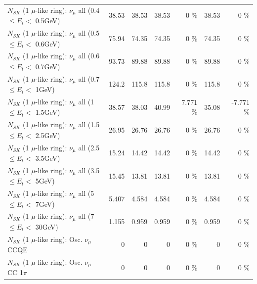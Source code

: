 \begin{table}
\begin{tabular}{| l | r | r | r  r | r  r |}
       $N_{SK}$ (1 $\mu$-like ring): $\nu_{\mu}$ all (0.4 $\leq E_{t} <$ 0.5GeV) &           38.53 &           38.53 &           38.53 &        0 \%  &           38.53 &        0 \%  \\ 
       $N_{SK}$ (1 $\mu$-like ring): $\nu_{\mu}$ all (0.5 $\leq E_{t} <$ 0.6GeV) &           75.94 &           74.35 &           74.35 &        0 \%  &           74.35 &        0 \%  \\ 
       $N_{SK}$ (1 $\mu$-like ring): $\nu_{\mu}$ all (0.6 $\leq E_{t} <$ 0.7GeV) &           93.73 &           89.88 &           89.88 &        0 \%  &           89.88 &        0 \%  \\ 
         $N_{SK}$ (1 $\mu$-like ring): $\nu_{\mu}$ all (0.7 $\leq E_{t} <$ 1GeV) &           124.2 &           115.8 &           115.8 &        0 \%  &           115.8 &        0 \%  \\ 
         $N_{SK}$ (1 $\mu$-like ring): $\nu_{\mu}$ all (1 $\leq E_{t} <$ 1.5GeV) &           38.57 &           38.03 &           40.99 &    7.771 \%  &           35.08 &   -7.771 \%  \\ 
       $N_{SK}$ (1 $\mu$-like ring): $\nu_{\mu}$ all (1.5 $\leq E_{t} <$ 2.5GeV) &           26.95 &           26.76 &           26.76 &        0 \%  &           26.76 &        0 \%  \\ 
       $N_{SK}$ (1 $\mu$-like ring): $\nu_{\mu}$ all (2.5 $\leq E_{t} <$ 3.5GeV) &           15.24 &           14.42 &           14.42 &        0 \%  &           14.42 &        0 \%  \\ 
         $N_{SK}$ (1 $\mu$-like ring): $\nu_{\mu}$ all (3.5 $\leq E_{t} <$ 5GeV) &           15.45 &           13.81 &           13.81 &        0 \%  &           13.81 &        0 \%  \\ 
           $N_{SK}$ (1 $\mu$-like ring): $\nu_{\mu}$ all (5 $\leq E_{t} <$ 7GeV) &           5.407 &           4.584 &           4.584 &        0 \%  &           4.584 &        0 \%  \\ 
          $N_{SK}$ (1 $\mu$-like ring): $\nu_{\mu}$ all (7 $\leq E_{t} <$ 30GeV) &           1.155 &           0.959 &           0.959 &        0 \%  &           0.959 &        0 \%  \\ 
\hline
\hline
                               $N_{SK}$ (1 $\mu$-like ring): Osc. $\nu_\mu$ CCQE &               0 &               0 &               0 &        0 \%  &               0 &        0 \%  \\ 
                          $N_{SK}$ (1 $\mu$-like ring): Osc. $\nu_\mu$ CC 1$\pi$ &               0 &               0 &               0 &        0 \%  &               0 &        0 \%  \\ 

\end{tabular}
\end{table}
